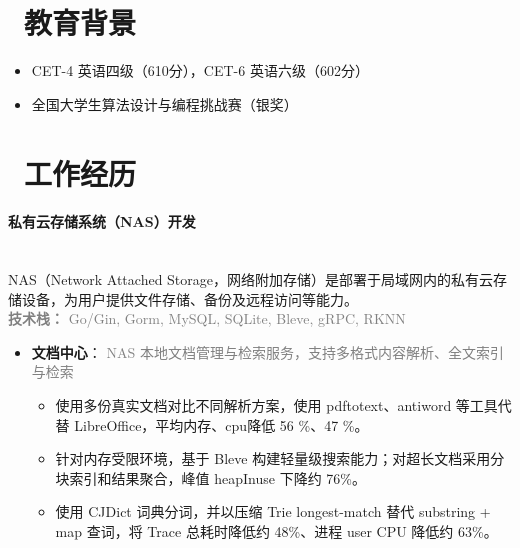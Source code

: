 \documentclass{styles/resume}
\begin{document}
\noindent\begin{minipage}{\textwidth}

\section[教育背景]{\faGraduationCap\ 教育背景}
\begin{itemize}
\item CET-4 英语四级（610分），CET-6 英语六级（602分）
\item 全国大学生算法设计与编程挑战赛（银奖）
\end{itemize}

\section[工作经历]{\faSuitcase\ 工作经历}

\paragraph*{私有云存储系统（NAS）开发}\mbox{}\\
{\small
\noindent NAS（Network Attached Storage，网络附加存储）是部署于局域网内的私有云存储设备，为用户提供文件存储、备份及远程访问等能力。\\
\noindent\textcolor{gray}{\textbf{技术栈：} Go/Gin, Gorm, MySQL, SQLite, Bleve, gRPC, RKNN}
}
\vspace{1ex}

\begin{itemize}

    \item \textbf{文档中心}：
    {\small
    \noindent\textcolor{gray}{NAS 本地文档管理与检索服务，支持多格式内容解析、全文索引与检索}
    }
    \vspace{0.2ex}
    \begin{itemize}
        \item 使用多份真实文档对比不同解析方案，使用 pdftotext、antiword 等工具代替 LibreOffice，平均内存、cpu降低 56 \%、47 \%。
        \item 针对内存受限环境，基于 Bleve 构建轻量级搜索能力；对超长文档采用分块索引和结果聚合，峰值 heapInuse 下降约 76\%。
        \item 使用 CJDict 词典分词，并以压缩 Trie longest-match 替代 substring + map 查词，将 Trace 总耗时降低约 48\%、进程 user CPU 降低约 63\%。
    \end{itemize}
    \vspace{1ex}


\end{itemize}
\end{minipage}
\end{document}
